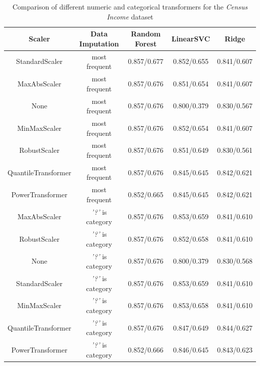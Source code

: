 \documentclass[a4paper,12pt]{article}
\begin{document}
\begin{table}[h!]
\centering
\small
\begin{tabular}{|c|c|c|c|c|}
\hline
\textbf{Scaler} & \textsf{Data Imputation} & \textbf{Random Forest} & \textbf{LinearSVC} & \textbf{Ridge} \\
\hline
StandardScaler & most frequent & \cellcolor[HTML]{C1E1C1}0.857/0.677 & 0.852/0.655 & 0.841/0.607 \\
\hline
MaxAbsScaler & most frequent & 0.857/0.676 & 0.851/0.654 & 0.841/0.607 \\
\hline
None & most frequent & 0.857/0.676 & 0.800/0.379 & 0.830/0.567 \\
\hline
MinMaxScaler & most frequent & 0.857/0.676 & 0.852/0.654 & 0.841/0.607 \\
\hline
RobustScaler & most frequent & 0.857/0.676 & 0.851/0.649 & 0.830/0.561 \\
\hline
QuantileTransformer & most frequent & 0.857/0.676 & 0.845/0.645 & 0.842/0.621 \\
\hline
PowerTransformer & most frequent & 0.852/0.665 & 0.845/0.645 & 0.842/0.621 \\
\hline
MaxAbsScaler & \textit{'?'} is category & 0.857/0.676 & 0.853/0.659 & 0.841/0.610 \\
\hline
RobustScaler & \textit{'?'} is category & 0.857/0.676 & 0.852/0.658 & 0.841/0.610 \\
\hline
None & \textit{'?'} is category & 0.857/0.676 & 0.800/0.379 & 0.830/0.568 \\
\hline
StandardScaler & \textit{'?'} is category & 0.857/0.676 & \cellcolor[HTML]{C1E1C1}0.853/0.659 & 0.841/0.610 \\
\hline
MinMaxScaler & \textit{'?'} is category & 0.857/0.676 & 0.853/0.658 & 0.841/0.610 \\
\hline
QuantileTransformer & \textit{'?'} is category & 0.857/0.676 & 0.847/0.649 & \cellcolor[HTML]{C1E1C1}0.844/0.627 \\
\hline
PowerTransformer & \textit{'?'} is category & 0.852/0.666 & 0.846/0.645 & 0.843/0.623 \\
\hline
\end{tabular}
\caption{Comparison of different numeric and categorical transformers for the \textit{Census Income} dataset}
\label{table:censustransformers}
\end{table}
\end{document}
